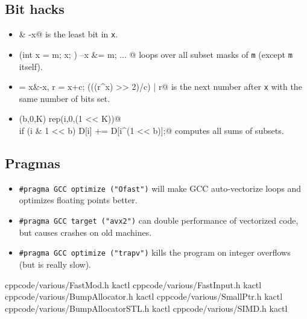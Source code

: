 	\subsection{Bit hacks}
		\begin{itemize}
			\item \verb@x & -x@ is the least bit in \texttt{x}.
			\item \verb@for (int x = m; x; ) { --x &= m; ... }@ loops over all subset masks of \texttt{m} (except \texttt{m} itself).
			\item \verb@c = x&-x, r = x+c; (((r^x) >> 2)/c) | r@ is the next number after \texttt{x} with the same number of bits set.
			\item \verb@rep(b,0,K) rep(i,0,(1 << K))@ \\ \verb@  if (i & 1 << b) D[i] += D[i^(1 << b)];@ computes all sums of subsets.
		\end{itemize}
	\subsection{Pragmas}
		\begin{itemize}
			\item \lstinline{#pragma GCC optimize ("Ofast")} will make GCC auto-vectorize loops and optimizes floating points better.
			\item \lstinline{#pragma GCC target ("avx2")} can double performance of vectorized code, but causes crashes on old machines.
			\item \lstinline{#pragma GCC optimize ("trapv")} kills the program on integer overflows (but is really slow).
		\end{itemize}
    {}{}
    {cpp}{code/various/FastMod.h}
    {kactl}
    {}{}
    {cpp}{code/various/FastInput.h}
    {kactl}
    {}{}
    {cpp}{code/various/BumpAllocator.h}
    {kactl}
    {}{}
    {cpp}{code/various/SmallPtr.h}
    {kactl}
    {}{}
    {cpp}{code/various/BumpAllocatorSTL.h}
    {kactl}
    {}{}
    {cpp}{code/various/SIMD.h}
    {kactl}
